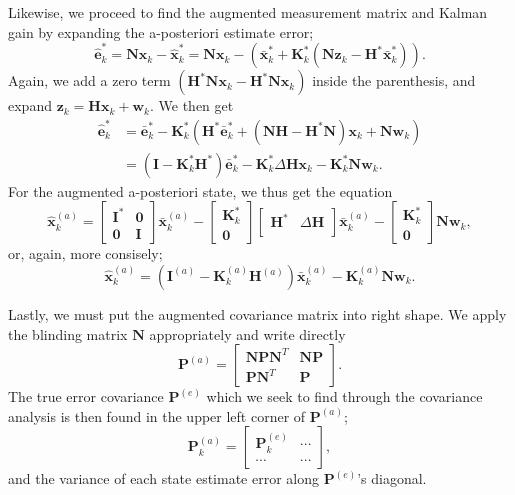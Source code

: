 \documentclass[11pt]{article}
\begin{document}
    Likewise, we proceed to find the augmented measurement matrix and Kalman
gain by expanding the a-posteriori estimate error; \[
\hat{\mathbf{e}}_k^* = \mathbf{Nx}_k - \hat{\mathbf{x}}_k^* = \mathbf{Nx}_k - (\bar{\mathbf{x}}_k^* + \mathbf{K}_k^*(\mathbf{Nz}_k - \mathbf{H}^* \bar{\mathbf{x}}_k^*)).
\] Again, we add a zero term
\((\mathbf{H}^*\mathbf{N}\mathbf{x}_k - \mathbf{H}^*\mathbf{N}\mathbf{x}_k)\)
inside the parenthesis, and expand
\(\mathbf{z}_k = \mathbf{Hx}_k + \mathbf{w}_k\). We then get \[
\begin{aligned}
\hat{\mathbf{e}}_k^* &= \bar{\mathbf{e}}_k^* - \mathbf{K}_k^*(\mathbf{H}^* \bar{\mathbf{e}}_k^* + (\mathbf{NH} - \mathbf{H}^*\mathbf{N})\mathbf{x}_k + \mathbf{Nw}_k) \\
&= (\mathbf{I} - \mathbf{K}_k^*\mathbf{H}^*)\bar{\mathbf{e}}_k^* - \mathbf{K}_k^* \Delta \mathbf{H} \mathbf{x}_k - \mathbf{K}_k^* \mathbf{Nw}_k.
\end{aligned}
\] For the augmented a-posteriori state, we thus get the equation \[
\hat{\mathbf{x}}^{(a)}_k = 
\begin{bmatrix}
\mathbf{I}^* & \mathbf{0} \\
\mathbf{0} & \mathbf{I}
\end{bmatrix}
\bar{\mathbf{x}}^{(a)}_k
-
\begin{bmatrix}
\mathbf{K}_k^* \\ \mathbf{0}
\end{bmatrix}
\begin{bmatrix}
\mathbf{H}^* & \Delta \mathbf{H} \\
\end{bmatrix}
\bar{\mathbf{x}}^{(a)}_k
-
\begin{bmatrix}
\mathbf{K}_k^* \\ \mathbf{0}
\end{bmatrix}
\mathbf{Nw}_k,
\] or, again, more consisely; \[
\hat{\mathbf{x}}^{(a)}_k = (\mathbf{I}^{(a)} - \mathbf{K}_k^{(a)} \mathbf{H}^{(a)}) \bar{\mathbf{x}}^{(a)}_k - \mathbf{K}_k^{(a)} \mathbf{Nw}_k.
\]

    Lastly, we must put the augmented covariance matrix into right shape. We
apply the blinding matrix \(\mathbf{N}\) appropriately and write
directly \[
\mathbf{P}^{(a)} = 
\begin{bmatrix}
\mathbf{NPN}^T & \mathbf{NP} \\
\mathbf{PN}^T & \mathbf{P}
\end{bmatrix}.
\] The true error covariance \(\mathbf{P}^{(e)}\) which we seek to find
through the covariance analysis is then found in the upper left corner
of \(\mathbf{P}^{(a)}\); \[
\mathbf{P}^{(a)}_k = 
\begin{bmatrix}
\mathbf{P}^{(e)}_k & \cdots \\
\cdots & \cdots
\end{bmatrix},
\] and the variance of each state estimate error along
\(\mathbf{P}^{(e)}\)'s diagonal.
\end{document}
